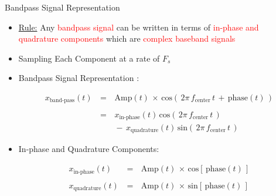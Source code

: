 \documentclass{beamer}
\begin{document}
\begin{frame}[t,allowframebreaks]{Bandpass Signal Representation}

\begin{itemize}
	
\item \underline{Rule:}  Any \textcolor{red}{bandpass signal} can be written in terms of \textcolor{red}{in-phase and quadrature components} which are \textcolor{red}{complex baseband signals}
	
	
\item Sampling Each Component at a rate of $F_s$

\item Bandpass Signal Representation \cite{DSP_Proakis} \cite{paper_bandpass_sampling_theory}:

	\begin{equation}
\begin{array}{rcl}
x_{\text{band-pass}}(t) \, &=&\, \text{Amp}(t) \, \times \, \text{cos}\left(\, 2 \pi \, f_{\text{center}} \, t \, + \, \text{phase}(t) \,\right)\\ \\
&=&\, x_{\text{in-phase}}(t) \, \text{cos}\left( \, 2 \pi \, f_{\text{center}} \, t \,\right) \\
 && \, - \, x_{\text{quadrature}}(t) \, \text{sin}\left( \, 2 \pi \, f_{\text{center}} \, t \,\right)
\end{array}
\label{Eq:Sampling:based_band_general_form_time_domain_recap}
\end{equation}


\item In-phase and Quadrature Components:

	
	\begin{equation}
\begin{array}{rcl}
x_{\text{in-phase}}(t) \, &=& \, \text{Amp}(t) \, \times \, \text{cos}\left[\, \text{phase}(t) \, \right] \\ \\
x_{\text{quadrature}}(t) \, &=& \, \text{Amp}(t) \, \times \, \text{sin}\left[\, \text{phase}(t) \, \right] \\ \\
\end{array}
\label{Eq:Sampling:inpahse_quadrature_signals}
\end{equation}
	
	
\end{itemize}

\end{frame}
\end{document}
